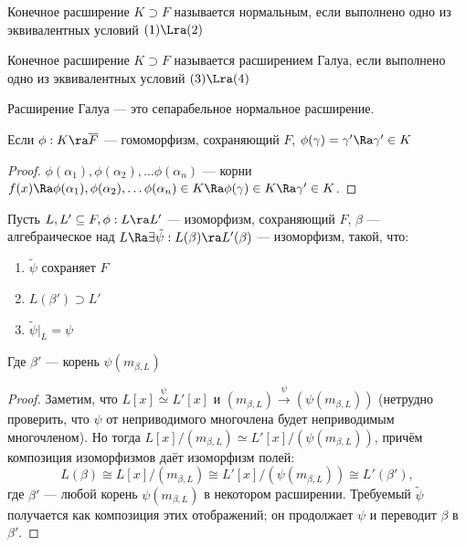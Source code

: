 \begin{definition}
    Конечное расширение \(K \supset F\) называется нормальным, если выполнено одно из эквивалентных условий \((1) \Lra (2)\)
\end{definition}

\begin{definition}
    Конечное расширение \(K \supset F\) называется расширением Галуа, если выполнено одно из эквивалентных условий \((3) \Lra (4)\)
\end{definition}

\begin{note}
    Расширение Галуа --- это сепарабельное нормальное расширение.
\end{note}

\begin{lemma}
    Если \(\phi: K \ra \overline{F}\) --- гомоморфизм, сохраняющий \(F\), \(\phi(\gamma) = \gamma' \Ra \gamma' \in K\)
\end{lemma}
\begin{proof}
    \(\phi(\alpha_1), \phi(\alpha_2), \dots \phi(\alpha_n)\) --- корни \(f(x) \Ra \phi(\alpha_1), \phi(\alpha_2), \dots \phi(\alpha_n) \in K \Ra \phi(\gamma) \in K \Ra \gamma' \in K\).
\end{proof}

\begin{lemma}
    Пусть \(L, L' \subseteq F, \phi: L \ra L'\) --- изоморфизм, сохраняющий \(F\), \(\beta\) --- алгебраическое над \(L \Ra \exists \tilde{\psi}: L(\beta) \ra L'(\beta)\) --- изоморфизм, такой, что:
    \begin{enumerate}
        \item \(\tilde{\psi}\) сохраняет \(F\)
        \item \(L(\beta') \supset L'\)
        \item \(\tilde{\psi}|_L = \psi\)
    \end{enumerate}
    Где \(\beta'\) --- корень \(\psi(m_{\beta, L})\)
\end{lemma}
\begin{proof}
    Заметим, что \(L[x] \stackrel{\psi}{\simeq} L'[x]\) и \((m_{\beta, L}) \xrightarrow{\psi} (\psi(m_{\beta, L}))\) (нетрудно проверить, что \(\psi\) от неприводимого многочлена будет неприводимым многочленом). Но тогда \(L[x]/(m_{\beta, L}) \simeq L'[x]/(\psi(m_{\beta, L}))\), причём композиция изоморфизмов даёт изоморфизм полей:
\[
L(\beta) \cong L[x]/(m_{\beta,L}) \cong L'[x]/(\psi(m_{\beta,L})) \cong L'(\beta'),
\]
где \(\beta'\) — любой корень \(\psi(m_{\beta,L})\) в некотором расширении. Требуемый \(\tilde{\psi}\) получается как композиция этих отображений; он продолжает \(\psi\) и переводит \(\beta\) в \(\beta'\).
\end{proof}

